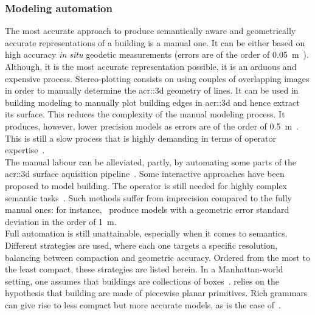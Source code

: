         \subsubsection{Modeling automation}
            The most accurate approach to produce semantically aware and geometrically accurate representations of a building is a manual one.
            It can be either based on high accuracy \textit{in situ} geodetic measurements (errors are of the order of \SI{0.05}{\m}~\parencite{kaartinen2005accuracy}).
            Although, it is the most accurate representation possible, it is an arduous and expensive process.
            Stereo-plotting consists on using couples of overlapping images in order to manually determine the \gls{acr::3d} geometry of lines.
            It can be used in building modeling to manually plot building edges in \gls{acr::3d} and hence extract its surface.
            This reduces the complexity of the manual modeling process.
            It produces, however, lower precision models as errors are of the order of \SI{0.5}{\m}~\parencite{jamet1995building}.
            This is still a slow process that is highly demanding in terms of operator expertise~\parencite{ruther2002application}.\\
            The manual labour can be alleviated, partly, by automating some parts of the \gls{acr::3d} surface aquisition pipeline~\parencite{musialski2013survey}.
            Some interactive approaches have been proposed to model building.
            The operator is still needed for highly complex semantic tasks~\parencite{mayunga2005semi, castellazzi2015laser}.
            Such methods suffer from imprecision compared to the fully manual ones: for instance,~\textcite{mayunga2005semi} produce models with a geometric error standard deviation in the order of \SI{1}{\m}.\\
            Full automation is still unattainable, especially when it comes to semantics.
            Different strategies are used, where each one targets a specific resolution, balancing between compaction and geometric accuracy.
            Ordered from the most to the least compact, these strategies are listed herein.
            In a Manhattan-world setting, one assumes that buildings are collections of boxes~\parencite{vanegas2010building, li2016manhattan}.
            \textcite{lafarge2012creating, nan2017polyfit} relies on the hypothesis that building are made of piecewise planar primitives.
            Rich grammars can give rise to less compact but more accurate models, as is the case of~\textcite{demir2015procedural,zeng2018neural}.

